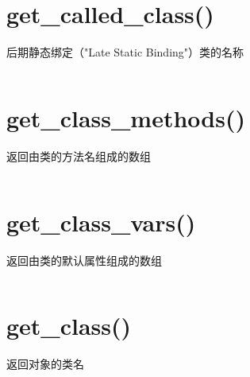 \begin{lstlisting}[language=PHP]

\end{lstlisting}




\begin{lstlisting}[language=PHP]

\end{lstlisting}




\begin{lstlisting}[language=PHP]

\end{lstlisting}

\section{get\_called\_class()}

后期静态绑定（"Late Static Binding"）类的名称

\begin{lstlisting}[language=PHP]

\end{lstlisting}


\section{get\_class\_methods()}

返回由类的方法名组成的数组


\begin{lstlisting}[language=PHP]

\end{lstlisting}


\section{get\_class\_vars()}

返回由类的默认属性组成的数组


\begin{lstlisting}[language=PHP]

\end{lstlisting}


\section{get\_class()}

返回对象的类名


\begin{lstlisting}[language=PHP]

\end{lstlisting}



